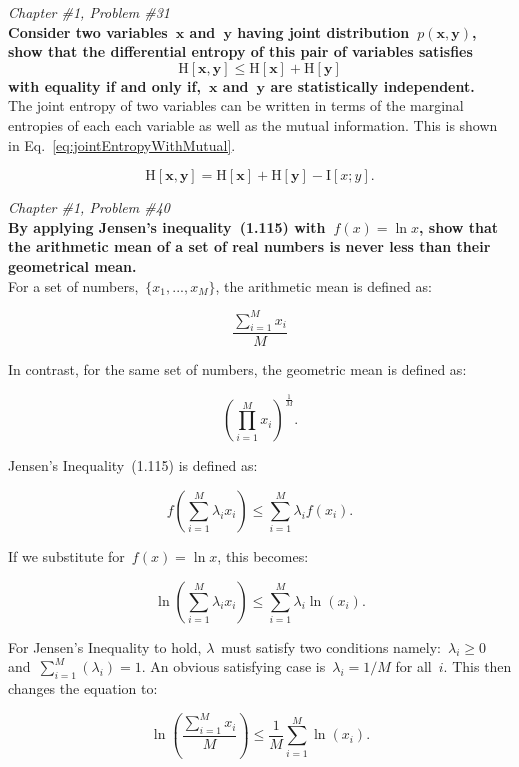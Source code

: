 \documentclass{report}
\newcommand{\problem}[3]{\noindent \textit{Chapter \##1, Problem \##2}
  \\
  \textbf{#3}  \\}
\begin{document}
  
  \newpage
  \problem{1}{31}{Consider two variables~$\mathbf{x}$ and~$\mathbf{y}$ having joint distribution~$p(\mathbf{x},\mathbf{y})$, show that the differential entropy of this pair of variables satisfies
  \[\textrm{H}[\mathbf{x},\mathbf{y}] \leq \textrm{H}[\mathbf{x}] + \textrm{H}[\mathbf{y}]\]
  with equality if and only if,~$\mathbf{x}$ and~$\mathbf{y}$ are statistically independent.}

  The joint entropy of two variables can be written in terms of the marginal entropies of each each variable as well as the mutual information.  This is shown in Eq.~\eqref{eq:jointEntropyWithMutual}.
  
  \begin{equation}
    \textrm{H}[\mathbf{x},\mathbf{y}] = \textrm{H}[\mathbf{x}] + \textrm{H}[\mathbf{y}] - \textrm{I}[x;y] \textrm{.}
    \label{eq:jointEntropyWithMutual}
  \end{equation}
  
  
  
  \newpage
  \problem{1}{40}{By applying Jensen's inequality~(1.115) with~$f(x)=\ln x$, show that the arithmetic mean of a set of real numbers is never less than their geometrical mean.}
  
  For a set of numbers,~$\{x_1,...,x_M\}$, the arithmetic mean is defined as:
  
  \[ \frac{\sum_{i=1}^{M}x_i}{M} \]
  
  In contrast, for the same set of numbers, the geometric mean is defined as:
  
  \[ \left( \prod_{i=1}^{M}x_i \right)^\frac{1}{M}\textrm{.} \]
  
  Jensen's Inequality~(1.115) is defined as:
  
  \[ f \left( \sum_{i=1}^M{\lambda_{i} x_i} \right) \leq \sum_{i=1}^M{\lambda_{i} f(x_i)}\textrm{.}\]
  
  If we substitute for~$f(x)=\ln x$, this becomes:

  \[ \ln \left( \sum_{i=1}^M{\lambda_{i} x_i} \right) \leq \sum_{i=1}^M{\lambda_{i} \ln(x_i)}\textrm{.} \]
  
  For Jensen's Inequality to hold, $\lambda$~must satisfy two conditions namely:~$\lambda_i \geq 0$ and~$\sum_{i=1}^{M}\left( \lambda_i \right) = 1$.  An obvious satisfying case is~$\lambda_i=1/M$ for all~$i$.  This then changes the equation to:
  
  \[ \ln \left( \frac{\sum_{i=1}^{M}{x_i}}{M} \right) \leq \frac{1}{M}\sum_{i=1}^M{\ln(x_i)}\textrm{.} \]
  
\end{document}
